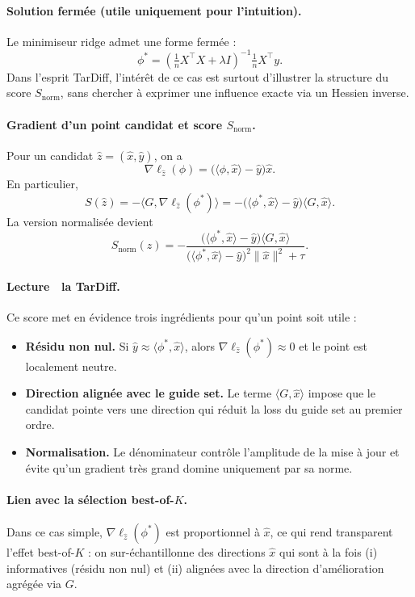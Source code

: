 \documentclass[11pt]{article}
\begin{document}
\paragraph{Solution fermée (utile uniquement pour l'intuition).}
Le minimiseur ridge admet une forme fermée :
\[
\phi^*=(\tfrac1n X^\top X+\lambda I)^{-1}\tfrac1n X^\top y.
\]
Dans l'esprit TarDiff, l'intérêt de ce cas est surtout d'illustrer la structure du score $S_{\text{norm}}$, sans chercher à exprimer une influence exacte via un Hessien inverse.

\paragraph{Gradient d'un point candidat et score $S_{\text{norm}}$.}
Pour un candidat $\hat z=(\hat x,\hat y)$, on a
\[
\nabla\ell_{\hat z}(\phi)=\big(\langle \phi,\hat x\rangle-\hat y\big)\hat x.
\]
En particulier,
\[
S(\hat z)=-\langle G,\nabla\ell_{\hat z}(\phi^*)\rangle
=-\big(\langle \phi^*,\hat x\rangle-\hat y\big)\langle G,\hat x\rangle.
\]
La version normalisée devient
\[
S_{\text{norm}}(\hat z)
=-\frac{\big(\langle \phi^*,\hat x\rangle-\hat y\big)\langle G,\hat x\rangle}{\big(\langle \phi^*,\hat x\rangle-\hat y\big)^2\|\hat x\|^2+\tau}.
\]

\paragraph{Lecture  la TarDiff.}
Ce score met en évidence trois ingrédients pour qu'un point soit utile :
\begin{itemize}[leftmargin=*]
\item \textbf{Résidu non nul.} Si $\hat y\approx\langle \phi^*,\hat x\rangle$, alors $\nabla\ell_{\hat z}(\phi^*)\approx 0$ et le point est localement neutre.
\item \textbf{Direction alignée avec le guide set.} Le terme $\langle G,\hat x\rangle$ impose que le candidat pointe vers une direction qui réduit la loss du guide set au premier ordre.
\item \textbf{Normalisation.} Le dénominateur contrôle l'amplitude de la mise à jour et évite qu'un gradient très grand domine uniquement par sa norme.
\end{itemize}

\paragraph{Lien avec la sélection best-of-$K$.}
Dans ce cas simple, $\nabla\ell_{\hat z}(\phi^*)$ est proportionnel à $\hat x$, ce qui rend transparent l'effet best-of-$K$ : on sur-échantillonne des directions $\hat x$ qui sont à la fois (i) informatives (résidu non nul) et (ii) alignées avec la direction d'amélioration agrégée via $G$.
\end{document}
